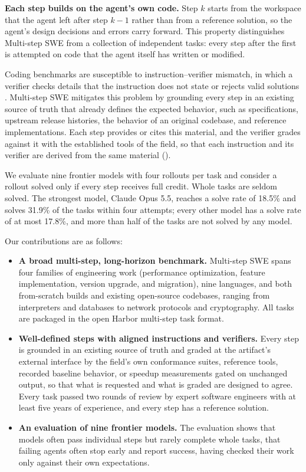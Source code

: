 \documentclass{article}
\newcommand{\bench}{Multi-step SWE\xspace}
\begin{document}
\textbf{Each step builds on the agent's own code.} Step $k$ starts from the
workspace that the agent left after step $k-1$ rather than from a reference
solution, so the agent's design decisions and errors carry forward. This
property distinguishes \bench from a collection of independent tasks: every
step after the first is attempted on code that the agent itself has written or
modified.

Coding benchmarks are susceptible to instruction--verifier mismatch, in which a
verifier checks details that the instruction does not state or rejects valid
solutions \citep{openai2024swebenchverified}. \bench mitigates this problem by
grounding every step in an existing source of truth that already defines the
expected behavior, such as specifications, upstream release histories, the
behavior of an original codebase, and reference implementations. Each step
provides or cites this material, and the verifier grades against it with the
established tools of the field, so that each instruction and its verifier are derived from the same
material ().

We evaluate nine frontier models with four rollouts per task and consider a
rollout solved only if every step receives full credit. Whole tasks are seldom
solved. The strongest model, Claude Opus 5.5, reaches a solve rate of 18.5\%
and solves 31.9\% of the tasks within four attempts; every other model has a
solve rate of at most 17.8\%, and more than half of the tasks are not solved by
any model.

Our contributions are as follows:
\begin{itemize}
  \item \textbf{A broad multi-step, long-horizon benchmark.} \bench spans four
    families of engineering work (performance optimization, feature implementation, version
    upgrade, and migration), nine languages, and both from-scratch builds and
    existing open-source codebases, ranging from interpreters and databases to
    network protocols and cryptography. All tasks are packaged in the open
    Harbor multi-step task format.
  \item \textbf{Well-defined steps with aligned instructions and verifiers.}
    Every step is grounded in an existing source of truth and graded at the
    artifact's external interface by the field's own conformance suites,
    reference tools, recorded baseline behavior, or speedup measurements
    gated on unchanged output, so that what is requested and what is graded are designed to
    agree. Every task passed two rounds of review by expert software
    engineers with at least five years of experience, and every step has a
    reference solution.
  \item \textbf{An evaluation of nine frontier models.} The evaluation shows
    that models often pass individual steps but rarely complete whole tasks,
    that failing agents often stop
    early and report success, having checked their work only against their own
    expectations.
\end{itemize}
\end{document}
